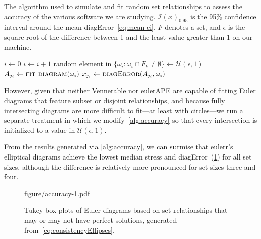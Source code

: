 \documentclass[
  oneside,
  openany,
  numbers=noendperiod,
  parskip=half,
  bibliography=totoc
]{scrbook}\usepackage[]{graphicx}\usepackage{xcolor}
\newcommand{\pkg}[1]{{\fontseries{b}\selectfont #1}}
\begin{document}
\begin{algorithm}[hbtp]
\caption{The algorithm used to simulate and fit random set relationships to assess
the accuracy of the various software we are studying. $\mathcal{I}(\bar{x})_{0.95}$
is the 95\% confidence interval around the mean diagError~\eqref{eq:mean-ci},
$F$ denotes a set, and
$\epsilon$ is the square root of the
difference between 1 and the least value greater than 1 on our machine.\label{alg:accuracy}}
\begin{algorithmic}
  \State $i \gets 0$
  \Do
    \State $i \gets i + 1$
      \State random element in $\{\omega_i : \omega_i \cap F_k \neq \emptyset\} \gets \mathcal{U}(\epsilon, 1)$
    \EndFor
      \State $A_{j_i} \gets \Call{fit diagram}{\omega_i}$
      \State $x_{j_i} \gets \Call{diagError}{A_{j_i},\omega_i}$
    \EndFor
\EndFor
\end{algorithmic}
\end{algorithm}

However, given that neither \pkg{Vennerable} nor \pkg{eulerAPE} are capable
of fitting Euler diagrams that feature subset or disjoint relationships, and
because fully intersecting diagrams are more difficult to fit---at least
with circles---we run a separate treatment
in which we modify~\cref{alg:accuracy} so that every intersection
is initialized to a value in $\mathcal{U}(\epsilon, 1)$.



From the results generated via \cref{alg:accuracy}, we can
surmise that \pkg{eulerr}'s elliptical diagrams achieve the lowest median stress and
diagError~(\cref{fig:accuracy}) for all set sizes, although the difference is
relatively more pronounced for set sizes three and four.

\begin{figure}[hbtp]
figure/accuracy-1.pdf
\caption{Tukey box plots of Euler diagrams based on set relationships that may
or may not have perfect solutions, generated from~\eqref{eq:consistencyEllipses}.\label{fig:accuracy}}
\end{figure}
\end{document}
